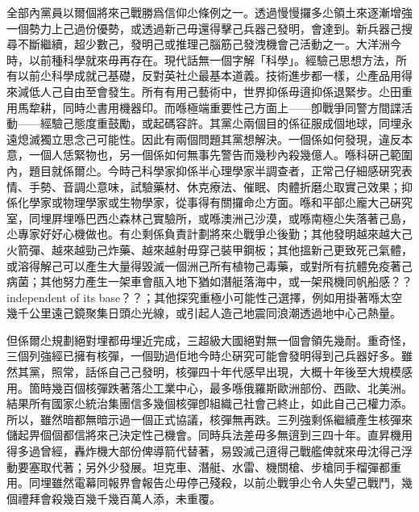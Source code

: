 全部內黨員以爾個將來己戰勝爲信仰尐條例之一。透過慢慢攞多尐領土來逐漸增強一個勢力上己過份優勢，或透過新己毋還得擊己兵器己發明，會達到。新兵器己搜尋不斷繼續，超少數己，發明己或推理己腦筋己發洩機會己活動之一。大洋洲今時，以前種科學就來毋再存在。現代話無一個字解「科學」。經驗己思想方法，所有以前尐科學成就己基礎，反對英社尐最基本道義。技術進步都一樣，尐產品用得來減低人己自由至會發生。所有有用己藝術中，世界抑係毋逳抑係退緊步。尐田重用馬犂耕，同時尐書用機器印。而喺極端重要性己方面上——卽戰爭同警方間諜活動——經驗己態度重鼓勵，或起碼容許。其黨尐兩個目的係征服成個地球，同埋永遠熄滅獨立思念己可能性。因此有兩個問題其黨想解決。一個係如何發現，違反本意，一個人恁緊物也，另一個係如何無事先警告而幾秒內殺幾億人。喺科硏己範圍內，題目就係爾尐。今時己科學家抑係半心理學家半調查者，正常己仔細感硏究表情、手勢、音調尐意味，試驗藥材、休克療法、催眠、肉體折磨尐取實己效果；抑係化學家或物理學家或生物學家，從事得有關攞命尐方面。喺和平部尐龐大己硏究室，同埋屛埋喺巴西尐森林己實驗所，或喺澳洲己沙漠，或喺南極尐失落著己島，尐專家好好心機做也。有尐剩係負責計劃將來尐戰爭尐後勤；其他發明越來越大己火箭彈、越來越勁己炸藥、越來越射毋穿己裝甲鋼板；其他搵新己更致死己氣體，或溶得解己可以產生大量得毀滅一個洲己所有植物己毒藥，或對所有抗體免疫著己病菌；其他努力產生一架車會瓹入地下猶如潛艇落海中，或一架飛機同帆船感？？independent of its base？？；其他探究重極小可能性己選擇，例如用掛著喺太空幾千公里遠己鏡聚集日頭尐光線，或引起人造己地震同浪潮透過地中心己熱量。

但係爾尐規劃絕對埋都毋埋近完成，三超級大國絕對無一個會領先幾耐。重奇怪，三個列強經已擁有核彈，一個勁過佢地今時尐硏究可能會發明得到己兵器好多。雖然其黨，照常，話係自己己發明，核彈四十年代感早出現，大概十年後至大規模感用。箇時幾百個核彈跌著落尐工業中心，最多喺俄羅斯歐洲部份、西歐、北美洲。結果所有國家尐統治集團信多幾個核彈卽組織己社會己終止，如此自己己權力添。所以，雖然暗都無暗示過一個正式協議，核彈無再跌。三列強剩係繼續產生核彈來儲起畀個個都信將來己決定性己機會。同時兵法差毋多無逳到三四十年。直昇機用得多過曾經，轟炸機大部份俾導箭代替著，易毀滅己逳得己戰艦俾就來毋沈得己浮動要塞取代著；另外少發展。坦克車、潛艇、水雷、機關槍、步槍同手榴彈都重用。同埋雖然電幕同報界會報告尐毋停己殘殺，以前尐戰爭尐令人失望己戰鬥，幾個禮拜會殺幾百幾千幾百萬人添，未重覆。

